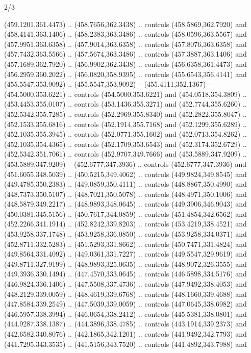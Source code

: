 \begin{flagdescription}{2/3}
\begin{scope}[xshift=0.5\flaglength,yshift=0.5\flagwidth,scale=\flagwidth/495.65]
\begin{scope}[y=0.8pt, x=0.8pt, yscale=-1,shift={(-463.76,-309.78)}]
  (459.1201,361.4473) .. (458.7656,362.3438) .. controls (458.5869,362.7920) and
  (458.4141,363.1406) .. (458.2383,363.3486) .. controls (458.0596,363.5567) and
  (457.9951,363.6358) .. (457.9014,363.6358) .. controls (457.8076,363.6358) and
  (457.7432,363.5566) .. (457.5674,363.3486) .. controls (457.3887,363.1406) and
  (457.1689,362.7920) .. (456.9902,362.3438) .. controls (456.6358,361.4473) and
  (456.2959,360.2022) .. (456.0820,358.9395) .. controls (455.6543,356.4141) and
  (455.5547,353.9092) .. (455.5547,353.9092) -- (455.4111,352.1367) --
  (454.5000,353.6221) .. controls (454.5000,353.6221) and (454.0518,354.3809) ..
  (453.4453,355.0107) .. controls (453.1436,355.3271) and (452.7744,355.6260) ..
  (452.5342,355.7285) .. controls (452.2969,355.8340) and (452.2822,355.8047) ..
  (452.1533,355.6816) .. controls (452.1914,355.7168) and (452.1299,355.6289) ..
  (452.1035,355.3945) .. controls (452.0771,355.1602) and (452.0713,354.8262) ..
  (452.1035,354.4365) .. controls (452.1709,353.6543) and (452.3174,352.6729) ..
  (452.5342,351.7061) .. controls (452.9707,349.7666) and (453.5889,347.9209) ..
  (453.5889,347.9209) -- (452.6777,347.3936) .. controls (452.6777,347.3936) and
  (451.6055,348.5039) .. (450.5215,349.4062) .. controls (449.9824,349.8545) and
  (449.4785,350.2383) .. (449.0859,350.4111) .. controls (448.8867,350.4990) and
  (448.7373,350.5107) .. (448.7021,350.5078) .. controls (448.4971,350.1006) and
  (448.5879,349.2217) .. (448.9893,348.0645) .. controls (449.3906,346.9043) and
  (450.0381,345.5156) .. (450.7617,344.0859) .. controls (451.4854,342.6562) and
  (452.2266,341.1914) .. (452.8242,339.8203) .. controls (453.4219,338.4521) and
  (453.9258,337.1748) .. (453.9258,336.0850) .. controls (453.9258,334.0371) and
  (452.8711,332.5283) .. (451.5293,331.8662) .. controls (450.7471,331.4824) and
  (449.8564,331.4092) .. (449.0361,331.7227) .. controls (449.5547,329.9619) and
  (449.8711,327.9199) .. (448.9893,325.0635) .. controls (448.9072,326.3555) and
  (449.3936,330.1494) .. (447.4570,333.0645) .. controls (446.5898,334.5176) and
  (446.9824,336.1406) .. (447.5508,337.4736) .. controls (447.9492,338.4053) and
  (448.2129,339.0059) .. (448.4619,339.6768) .. controls (448.1660,339.4688) and
  (447.8584,339.2549) .. (447.5039,339.0059) .. controls (447.0645,338.6982) and
  (446.5957,338.3994) .. (446.0654,338.2412) .. controls (445.5381,338.0801) and
  (444.9287,338.1387) .. (444.3896,338.4785) .. controls (443.1914,339.2373) and
  (442.6582,340.8076) .. (442.1865,342.1201) .. controls (441.9492,342.7793) and
  (441.7295,343.3535) .. (441.5156,343.7520) .. controls (441.4892,343.7988) and

\end{scope}
\end{scope}
\end{flagdescription}
